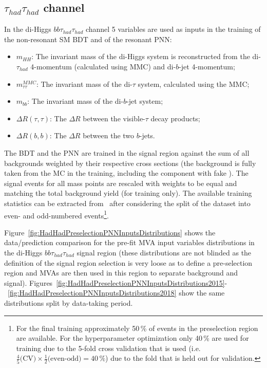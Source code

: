 \subsection{$\tau_{had}\tau_{had}$ channel}
\label{ssec:mva_hadhad}

In the di-Higgs $bb\tau_{had}\tau_{had}$ channel 5 variables are used as inputs in the training of the non-resonant SM BDT and of the resonant PNN:

\begin{itemize}
\item $m_{HH}$: The invariant mass of the di-Higgs system is reconstructed from the di-$\tau_{had}$ 4-momentum (calculated using MMC) and di-$b$-jet 4-momentum;
\item $m_{\tau\tau}^{MMC}$: The invariant mass of the di-$\tau$ system, calculated using the MMC;
\item $m_{bb}$: The invariant mass of the di-$b$-jet system;
\item $\Delta  R(\tau, \tau)$: The  $\Delta R$ between the visible-$\tau$ decay products;
\item $\Delta  R(b, b)$: The  $\Delta R$ between the two $b$-jets.
\end{itemize}

The BDT and the PNN are trained in the signal region against the sum
of all backgrounds weighted by their respective cross sections (the
\ttbar background is fully taken from the MC in the training,
including the component with fake \tauhad). The signal events for all
mass points are rescaled with weights to be equal and matching the
total background yield (for training only). The available training
statistics can be extracted from~ after
considering the split of the dataset into even- and odd-numbered
events\footnote{For the final training approximately 50\,\% of events
  in the preselection region are available. For the hyperparameter
  optimization only 40\,\% are used for training due to the 5-fold
  cross validation that is used (i.e.\
  $\frac{4}{5} \text{(CV)} \times \frac{1}{2} \text{(even-odd)} =
  40\,\%$) due to the fold that is held out for validation.}.

Figure~\ref{fig:HadHadPreselectionPNNInputsDistributions} shows the data/prediction comparison for the pre-fit MVA input variables distributions in the di-Higgs $bb\tau_{had}\tau_{had}$ signal region (these distributions are not blinded as the definition of the signal region selection is very loose as to define a pre-selection region and MVAs are then used in this region to separate background and signal).  Figures~\ref{fig:HadHadPreselectionPNNInputsDistributions2015}-~\ref{fig:HadHadPreselectionPNNInputsDistributions2018} show the same distributions split by data-taking period.


